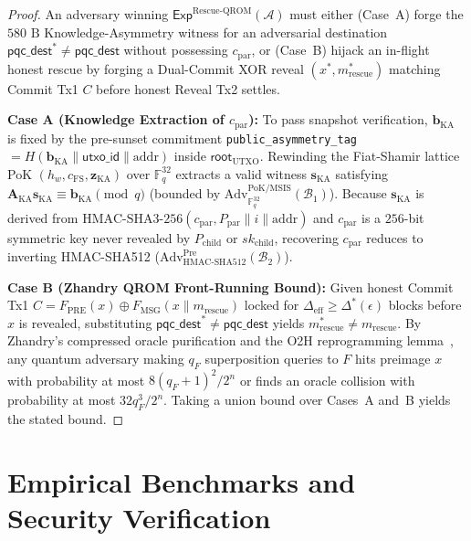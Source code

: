 \documentclass[conference,compsoc]{IEEEtran}
\begin{document}
\begin{proof}
An adversary winning $\mathsf{Exp}^{\mathrm{Rescue\text{-}QROM}}(\mathcal{A})$ must either (Case~A) forge the $580\text{ B}$ Knowledge-Asymmetry witness for an adversarial destination $\mathsf{pqc\_dest}^* \ne \mathsf{pqc\_dest}$ without possessing $c_{\mathrm{par}}$, or (Case~B) hijack an in-flight honest rescue by forging a Dual-Commit XOR reveal $(x^*, m^*_{\mathrm{rescue}})$ matching Commit Tx1 $C$ before honest Reveal Tx2 settles.

\textbf{Case A (Knowledge Extraction of $c_{\mathrm{par}}$):} To pass snapshot verification, $\mathbf{b}_{\mathrm{KA}}$ is fixed by the pre-sunset commitment \texttt{public\_\allowbreak asymmetry\_\allowbreak tag} $= H(\mathbf{b}_{\mathrm{KA}} \parallel \mathsf{utxo\_id} \parallel \mathrm{addr})$ inside $\mathsf{root}_{\mathrm{UTXO}}$. Rewinding the Fiat-Shamir lattice PoK $(h_w, c_{\mathrm{FS}}, \mathbf{z}_{\mathrm{KA}})$ over $\mathbb{F}_q^{32}$ extracts a valid witness $\mathbf{s}_{\mathrm{KA}}$ satisfying $\mathbf{A}_{\mathrm{KA}}\mathbf{s}_{\mathrm{KA}} \equiv \mathbf{b}_{\mathrm{KA}} \pmod q$ (bounded by $\mathrm{Adv}^{\mathrm{PoK/MSIS}}_{\mathbb{F}_q^{32}}(\mathcal{B}_1)$). Because $\mathbf{s}_{\mathrm{KA}}$ is derived from $\mathrm{HMAC\text{-}SHA3\text{-}256}(c_{\mathrm{par}}, P_{\mathrm{par}} \parallel i \parallel \mathrm{addr})$ and $c_{\mathrm{par}}$ is a $256$-bit symmetric key never revealed by $P_{\mathrm{child}}$ or $sk_{\mathrm{child}}$, recovering $c_{\mathrm{par}}$ reduces to inverting HMAC-SHA512 ($\mathrm{Adv}^{\mathrm{Pre}}_{\mathrm{HMAC\text{-}SHA512}}(\mathcal{B}_2)$).

\textbf{Case B (Zhandry QROM Front-Running Bound):} Given honest Commit Tx1 $C = F_{\mathrm{PRE}}(x) \oplus F_{\mathrm{MSG}}(x \parallel m_{\mathrm{rescue}})$ locked for $\Delta_{\text{eff}} \ge \Delta^*(\epsilon)$ blocks before $x$ is revealed, substituting $\mathsf{pqc\_dest}^* \ne \mathsf{pqc\_dest}$ yields $m^*_{\mathrm{rescue}} \ne m_{\mathrm{rescue}}$. By Zhandry's compressed oracle purification and the O2H reprogramming lemma~\cite{zhandry2019,aqmp2026}, any quantum adversary making $q_F$ superposition queries to $F$ hits preimage $x$ with probability at most $8(q_F + 1)^2 / 2^n$ or finds an oracle collision with probability at most $32 q_F^3 / 2^n$. Taking a union bound over Cases~A and~B yields the stated bound.
\end{proof}

\section{Empirical Benchmarks and Security Verification}
\label{sec:benchmarks}
\end{document}
